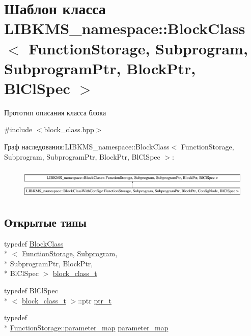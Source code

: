 \hypertarget{classLIBKMS__namespace_1_1BlockClass}{\section{Шаблон класса L\-I\-B\-K\-M\-S\-\_\-namespace\-:\-:Block\-Class$<$ Function\-Storage, Subprogram, Subprogram\-Ptr, Block\-Ptr, Bl\-Cl\-Spec $>$}
\label{classLIBKMS__namespace_1_1BlockClass}
}


Прототип описания класса блока  




{\ttfamily \#include $<$block\-\_\-class.\-hpp$>$}

Граф наследования\-:L\-I\-B\-K\-M\-S\-\_\-namespace\-:\-:Block\-Class$<$ Function\-Storage, Subprogram, Subprogram\-Ptr, Block\-Ptr, Bl\-Cl\-Spec $>$\-:\begin{figure}[H]
\begin{center}
\leavevmode
\includegraphics[height=1.499331cm]{classLIBKMS__namespace_1_1BlockClass}
\end{center}
\end{figure}
\subsection*{Открытые типы}
\begin{DoxyCompactItemize}
\item 
typedef \hyperlink{classLIBKMS__namespace_1_1BlockClass}{Block\-Class}\\*
$<$ \hyperlink{classLIBKMS__namespace_1_1FunctionStorage}{Function\-Storage}, \hyperlink{classLIBKMS__namespace_1_1Subprogram}{Subprogram}, \\*
Subprogram\-Ptr, Block\-Ptr, \\*
Bl\-Cl\-Spec $>$ \hyperlink{classLIBKMS__namespace_1_1BlockClass_a505cb3abde8bf16a22913254fe5236a8}{block\-\_\-class\-\_\-t}
\item 
typedef Bl\-Cl\-Spec\\*
$<$ \hyperlink{classLIBKMS__namespace_1_1BlockClass_a505cb3abde8bf16a22913254fe5236a8}{block\-\_\-class\-\_\-t} $>$\-::ptr \hyperlink{classLIBKMS__namespace_1_1BlockClass_a37593e298865c9e7050501f7ef176c91}{ptr\-\_\-t}
\item 
typedef \\*
\hyperlink{classLIBKMS__namespace_1_1FunctionStorage_a82b240ff1d5e266642cadfdebd37dfa2}{Function\-Storage\-::parameter\-\_\-map} \hyperlink{classLIBKMS__namespace_1_1BlockClass_a3cd7da1e7c30b9f047e99b6c1c433ff4}{parameter\-\_\-map}
\end{DoxyCompactItemize}

